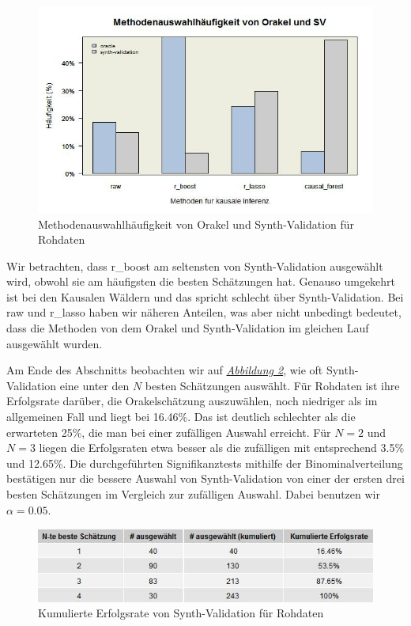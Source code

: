 \documentclass[12pt,a4paper,twoside]{scrartcl}
\numberwithin{equation}{section}
\newcommand{\reffig}[1]{\emph{\hyperref[#1]{Abbildung \ref*{#1}}}}
\begin{document}
\begin{center}
\begin{figure}[h]
    \centering
    \includegraphics[height=0.5\textwidth, width=1\textwidth]{figures/plots/rawDataBarplot.jpeg}
    \caption[Methodenauswahlhäufigkeit von Orakel und Synth-Validation für Rohdaten]{Methodenauswahlhäufigkeit von Orakel und Synth-Validation für Rohdaten}\label{fig:rawDataBarplot}
  \end{figure}
\end{center}

\noindent
Wir betrachten, dass r\_boost am seltensten von Synth-Validation ausgewählt wird, obwohl sie am häufigsten die besten Schätzungen hat. Genauso umgekehrt ist bei den Kausalen Wäldern und das spricht schlecht über Synth-Validation. Bei raw und r\_lasso haben wir näheren Anteilen, was aber nicht unbedingt bedeutet, dass die Methoden von dem Orakel und Synth-Validation im gleichen Lauf ausgewählt wurden. \par

\noindent
Am Ende des Abschnitts beobachten wir auf \reffig{fig:rawDataGrid}, wie oft Synth-Validation eine unter den $N$ besten Schätzungen auswählt. Für Rohdaten ist ihre Erfolgsrate darüber, die Orakelschätzung auszuwählen, noch niedriger als im allgemeinen Fall und liegt bei 16.46\%. Das ist deutlich schlechter als die erwarteten 25\%, die man bei einer zufälligen Auswahl erreicht. Für $N=2$ und $N=3$ liegen die Erfolgsraten etwa besser als die zufälligen mit entsprechend 3.5\% und 12.65\%. Die durchgeführten Signifikanztests mithilfe der Binominalverteilung bestätigen nur die bessere Auswahl von Synth-Validation von einer der ersten drei besten Schätzungen im Vergleich zur zufälligen Auswahl. Dabei benutzen wir $\alpha = 0.05$. \par

\begin{center}
\begin{figure}[h]
    \centering
    \includegraphics[height=0.2\textwidth, width=1\textwidth]{figures/plots/rawDataGrid.jpeg}
    \caption[Kumulierte Erfolgsrate von Synth-Validation für Rohdaten]{Kumulierte Erfolgsrate von Synth-Validation für Rohdaten}\label{fig:rawDataGrid}
  \end{figure}
\end{center}
\end{document}
